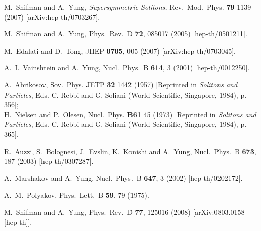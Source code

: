 \documentclass[12pt]{article}
\begin{document}
%
%
\small
\begin{thebibliography}{99}
\itemsep -2pt

M.~Shifman and A.~Yung,
{\sl Supersymmetric Solitons,}
Rev.\ Mod.\ Phys. {\bf 79} 1139 (2007)
[arXiv:hep-th/0703267].


M.~Shifman and A.~Yung,
Phys.\ Rev.\ D {\bf 72}, 085017 (2005)
[hep-th/0501211].
  
  M.~Edalati and D.~Tong,
  JHEP {\bf 0705}, 005 (2007)
  [arXiv:hep-th/0703045].

A.~I.~Vainshtein and A.~Yung,
Nucl.\ Phys.\ B {\bf 614}, 3 (2001)
[hep-th/0012250].

A.~Abrikosov, Sov.~Phys. JETP {\bf32} 1442  (1957)
[Reprinted in {\em Solitons and Particles}, Eds. C. Rebbi and G. Soliani
(World Scientific, Singapore, 1984), p. 356];\\
H.~Nielsen and P.~Olesen, Nucl.~Phys. {\bf B61} 45 (1973)
[Reprinted in {\em Solitons and Particles}, Eds. C. Rebbi and G. Soliani
(World Scientific, Singapore, 1984), p. 365].

R.~Auzzi, S.~Bolognesi, J.~Evslin, K.~Konishi and A.~Yung,
Nucl.\ Phys.\ B {\bf 673}, 187 (2003)
[hep-th/0307287].

A.~Marshakov and A.~Yung,
Nucl.\ Phys.\ B {\bf 647}, 3 (2002)
[hep-th/0202172].

A.~M.~Polyakov,
Phys.\ Lett.\ B {\bf 59}, 79 (1975).

  M.~Shifman and A.~Yung,
  Phys.\ Rev.\  D {\bf 77}, 125016 (2008)
  [arXiv:0803.0158 [hep-th]].

\end{thebibliography}
\end{document}
